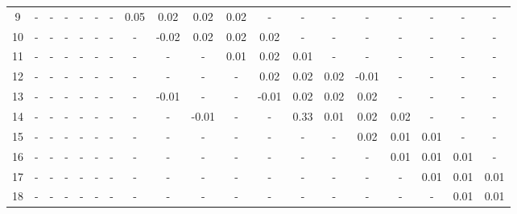 \documentclass[a4paper,11pt]{article}
\begin{document}
\begin{table}[h]
\begin{tabular}{ccccccccccccccccccc}
9           &     - &     - &     - &     - &     - &     - &  0.05 &  0.02 &  0.02 &  0.02 &     - &     - &     - &     - &     - &     - &     - &     - \\
10          &     - &     - &     - &     - &     - &     - &     - & -0.02 &  0.02 &  0.02 &  0.02 &     - &     - &     - &     - &     - &     - &     - \\
11          &     - &     - &     - &     - &     - &     - &     - &     - &     - &  0.01 &  0.02 &  0.01 &     - &     - &     - &     - &     - &     - \\
12          &     - &     - &     - &     - &     - &     - &     - &     - &     - &     - &  0.02 &  0.02 &  0.02 & -0.01 &     - &     - &     - &     - \\
13          &     - &     - &     - &     - &     - &     - &     - & -0.01 &     - &     - & -0.01 &  0.02 &  0.02 &  0.02 &     - &     - &     - &     - \\
14          &     - &     - &     - &     - &     - &     - &     - &     - & -0.01 &     - &     - &  0.33 &  0.01 &  0.02 &  0.02 &     - &     - &     - \\
15          &     - &     - &     - &     - &     - &     - &     - &     - &     - &     - &     - &     - &     - &  0.02 &  0.01 &  0.01 &     - &     - \\
16          &     - &     - &     - &     - &     - &     - &     - &     - &     - &     - &     - &     - &     - &     - &  0.01 &  0.01 &  0.01 &     - \\
17          &     - &     - &     - &     - &     - &     - &     - &     - &     - &     - &     - &     - &     - &     - &     - &  0.01 &  0.01 &  0.01 \\
18          &     - &     - &     - &     - &     - &     - &     - &     - &     - &     - &     - &     - &     - &     - &     - &     - &  0.01 &  0.01 \\
\end{tabular}
\end{table}
\end{document}
